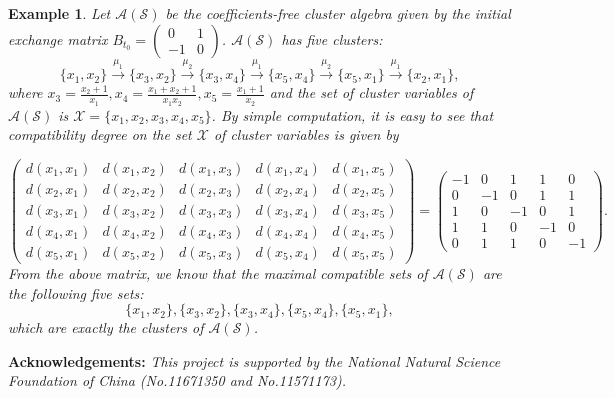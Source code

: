 \documentclass[14pt]{amsart}
\newtheorem{Example}[Theorem]{Example}
\begin{document}
\begin{Example}
Let $\mathcal A(\mathcal S)$ be the coefficients-free cluster algebra given by the initial exchange matrix $B_{t_0}=\begin{pmatrix}0&1\\-1&0\end{pmatrix}$. $\mathcal A(\mathcal S)$ has five clusters:
$$\{x_1,x_2\}\xrightarrow{\mu_1}\{x_3,x_2\}\xrightarrow{\mu_2}\{x_3,x_4\}\xrightarrow{\mu_1}\{x_5,x_4\}
\xrightarrow{\mu_2}\{x_5,x_1\}\xrightarrow{\mu_1}\{x_2,x_1\},$$
where $x_3=\frac{x_2+1}{x_1},x_4=\frac{x_1+x_2+1}{x_1x_2},x_5=\frac{x_1+1}{x_2}$ and the set of cluster variables of $\mathcal A(\mathcal S)$ is $\mathcal X=\{x_1,x_2,x_3,x_4,x_5\}$. By simple computation, it is easy to see that  compatibility degree on the set $\mathcal X$ of cluster variables is given by

$$\begin{pmatrix}d(x_1,x_1)&d(x_1,x_2)&d(x_1,x_3) &d(x_1,x_4)&d(x_1,x_5)\\d(x_2,x_1)&d(x_2,x_2)&d(x_2,x_3) &d(x_2,x_4)&d(x_2,x_5)\\d(x_3,x_1)&d(x_3,x_2)&d(x_3,x_3) &d(x_3,x_4)&d(x_3,x_5)\\d(x_4,x_1)&d(x_4,x_2)&d(x_4,x_3) &d(x_4,x_4)&d(x_4,x_5)\\d(x_5,x_1)&d(x_5,x_2)&d(x_5,x_3) &d(x_5,x_4)&d(x_5,x_5) \end{pmatrix}=\begin{pmatrix}-1&0&1&1&0\\0&-1&0&1&1\\1&0&-1&0&1\\1&1&0&-1&0\\0&1&1&0&-1
\end{pmatrix}.$$
From the above matrix, we know that the maximal compatible sets of $\mathcal A(\mathcal S)$ are the following five sets:
$$\{x_1,x_2\},\{ x_3,x_2\},\{x_3,x_4 \},\{x_5,x_4\},\{x_5,x_1\},$$
which are exactly the clusters of  $\mathcal A(\mathcal S)$.
\end{Example}
\vspace{5mm}



{\bf Acknowledgements:}\; {\em This project is supported by the National Natural Science Foundation of China (No.11671350 and No.11571173).}
\vspace{7mm}
\end{document}
